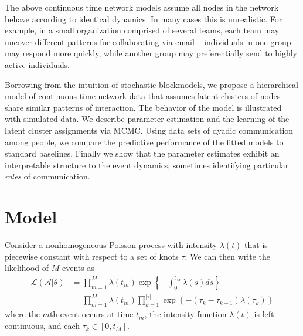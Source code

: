 \documentclass{article}
\begin{document}
The above continuous time network models assume all nodes in the network behave according to identical dynamics.  In many cases this is unrealistic.  For example, in a small organization comprised of several teams, each team may uncover different patterns for collaborating via email --  individuals in one group may respond more quickly, while another group may preferentially send to highly active individuals.  %

Borrowing from the intuition of stochastic blockmodels, we propose a hierarchical model of continuous time network data that assumes latent clusters of nodes share similar patterns of interaction.  The behavior of the model is illustrated with simulated data.  We describe parameter estimation and the learning of the latent cluster assignments via MCMC.  Using data sets of dyadic communication among people, we compare the predictive performance of the fitted models to standard baselines.  Finally we show that the parameter estimates exhibit an interpretable structure to the event dynamics, sometimes identifying particular \emph{roles} of communication.
  
\section{Model}

Consider a nonhomogeneous Poisson process with  intensity $\lambda(t)$ that is piecewise constant with respect to a set of knots $\tau$.  We can then write the likelihood of $M$ events as
\begin{align}
\mathcal{L}(\mathcal{A}|\theta) &= \prod_{m=1}^M \lambda(t_m) \exp\left\{ - \int_{0}^{t_M} \lambda(s)ds \right\} \\
&= \prod_{m=1}^M \lambda(t_m) \prod_{k=1}^{|\tau|} \exp\left\{ - (\tau_{k} - \tau_{k-1}) \lambda(\tau_k) \right\}
\end{align}
\noindent where the $m$th event occurs at time $t_m$, the intensity function $\lambda(t)$ is left continuous, and each $\tau_k \in [0,t_M]$.
\end{document}
